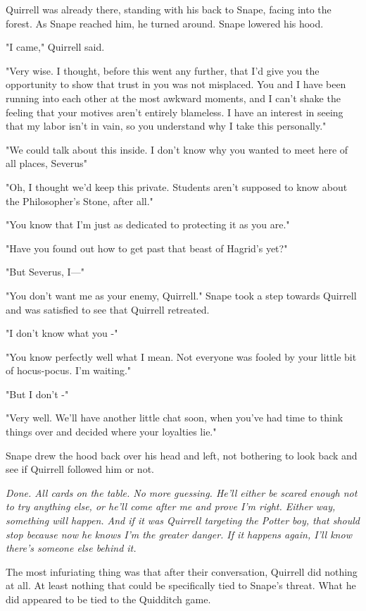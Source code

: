 Quirrell was already there, standing with his back to Snape, facing into the forest. As Snape reached him, he turned around. Snape lowered his hood.

"I came," Quirrell said.

"Very wise. I thought, before this went any further, that I'd give you the opportunity to show that trust in you was not misplaced. You and I have been running into each other at the most awkward moments, and I can't shake the feeling that your motives aren't entirely blameless. I have an interest in seeing that my labor isn't in vain, so you understand why I take this personally."

"We could{\el} talk about this inside. I{\el} don't know why you wanted{\el} to meet here of all{\el} places, Severus{\el}"

"Oh, I thought we'd keep this private. Students aren't supposed to know about the Philosopher's Stone, after all."

"You know that I'm{\el} just as dedicated to{\el} protecting it as{\el} you are."

"Have you found out how to get past that beast of Hagrid's yet?"

"{\el}But Severus, I—"

"You don't want me as your enemy, Quirrell." Snape took a step towards Quirrell and was satisfied to see that Quirrell retreated.

"{\el}I don't know what you -"

"You know perfectly well what I mean. Not everyone was fooled by your little bit of hocus-pocus. I'm waiting."

"{\el}But I{\el} don't -"

"Very well. We'll have another little chat soon, when you've had time to think things over and decided where your loyalties lie."

Snape drew the hood back over his head and left, not bothering to look back and see if Quirrell followed him or not.

\emph{Done. All cards on the table. No more guessing. He'll either be scared enough not to try anything else, or he'll come after me and prove I'm right. Either way, something will happen. And if it was Quirrell targeting the Potter boy, that should stop because now he knows I'm the greater danger. If it happens again, I'll know there's someone else behind it.}

The most infuriating thing was that after their conversation, Quirrell did nothing at all. At least nothing that could be specifically tied to Snape's threat. What he did appeared to be tied to the Quidditch game.

